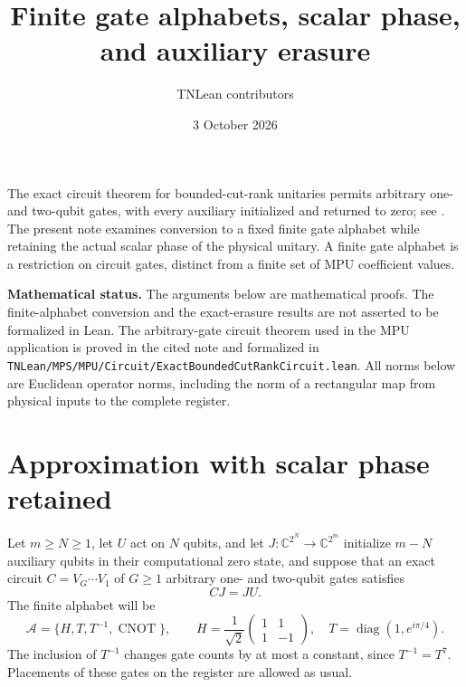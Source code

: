 \documentclass[11pt]{article}
\title{Finite gate alphabets, scalar phase, and auxiliary erasure}
\author{TNLean contributors}
\date{3 October 2026}
\begin{document}
\maketitle

The exact circuit theorem for bounded-cut-rank unitaries permits arbitrary
one- and two-qubit gates, with every auxiliary initialized and returned to
zero; see \cite[Section~5]{exact-mpu-circuits}. The present note
examines conversion to a fixed finite gate alphabet while retaining the
actual scalar phase of the physical unitary. A finite gate alphabet is a
restriction on circuit gates, distinct from a finite set of MPU coefficient
values.

\textbf{Mathematical status.} The arguments below are mathematical proofs.
The finite-alphabet conversion and the exact-erasure results are not
asserted to be formalized in Lean. The arbitrary-gate circuit theorem used
in the MPU application is proved in the cited note and formalized in
\nolinkurl{TNLean/MPS/MPU/Circuit/ExactBoundedCutRankCircuit.lean}.
All norms below are Euclidean operator norms, including the norm of a
rectangular map from physical inputs to the complete register.

\section{Approximation with scalar phase retained}

Let $m\geq N\geq1$, let $U$ act on $N$ qubits, and let $J:\mathbb C^{2^N}\to\mathbb C^{2^m}$
initialize $m-N$ auxiliary qubits in their computational zero state, and
suppose that an exact circuit $C=V_G\cdots V_1$ of $G\geq1$ arbitrary
one- and two-qubit gates satisfies
\begin{equation}\label{eq:finite-gate-exact-input}
 CJ=JU.
\end{equation}
The finite alphabet will be
\begin{equation}\label{eq:finite-gate-alphabet}
 \mathcal A=\{H,T,T^{-1},\operatorname{CNOT}\},\qquad
 H=\frac1{\sqrt2}\begin{pmatrix}1&1\\1&-1\end{pmatrix},\quad
 T=\operatorname{diag}(1,e^{i\pi/4}).
\end{equation}
The inclusion of $T^{-1}$ changes gate counts by at most a constant, since
$T^{-1}=T^7$. Placements of these gates on the register are allowed as usual.
\end{document}
